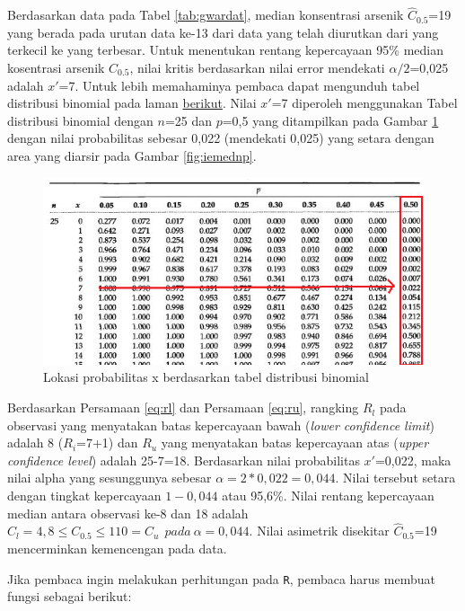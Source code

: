 \documentclass[]{book}
\begin{document}
Berdasarkan data pada Tabel \ref{tab:gwardat}, median konsentrasi
arsenik \(\hat{C}_{0.5}\)=19 yang berada pada urutan data ke-13 dari
data yang telah diurutkan dari yang terkecil ke yang terbesar. Untuk
menentukan rentang kepercayaan 95\% median kosentrasi arsenik
\(C_{0.5}\), nilai kritis berdasarkan nilai error mendekati
\(\alpha/2\)=0,025 adalah \(x'\)=7. Untuk lebih memahaminya pembaca
dapat mengunduh tabel distribusi binomial pada laman
\href{https://onlinepubs.trb.org/onlinepubs/nchrp/cd-22/manual/v2appendixc.pdf}{berikut}.
Nilai \(x'\)=7 diperoleh menggunakan Tabel distribusi binomial dengan
\(n\)=25 dan \(p\)=0,5 yang ditampilkan pada Gambar \ref{fig:tabbinom}
dengan nilai probabilitas sebesar 0,022 (mendekati 0,025) yang setara
dengan area yang diarsir pada Gambar \ref{fig:iemednp}.

\begin{figure}

{\centering \includegraphics[width=0.65\linewidth]{tabbinom} 

}

\caption{Lokasi probabilitas x berdasarkan tabel distribusi binomial}\label{fig:tabbinom}
\end{figure}

Berdasarkan Persamaan \eqref{eq:rl} dan Persamaan \eqref{eq:ru}, rangking
\(R_l\) pada observasi yang menyatakan batas kepercayaan bawah
(\emph{lower confidence limit}) adalah 8 (\(R_i\)=7+1) dan \(R_u\) yang
menyatakan batas kepercayaan atas (\emph{upper confidence level}) adalah
25-7=18. Berdasarkan nilai probabilitas \(x'\)=0,022, maka nilai alpha
yang sesunggunya sebesar \(\alpha=2*0,022=0,044\). Nilai tersebut setara
dengan tingkat kepercayaan \(1-0,044\) atau 95,6\%. Nilai rentang
kepercayaan median antara observasi ke-8 dan 18 adalah
\(C_l=4,8\le C_{0.5}\le110=C_u\ \ pada\ \alpha=0,044\). Nilai asimetrik
disekitar \(\hat{C}_{0.5}\)=19 mencerminkan kemencengan pada data.

Jika pembaca ingin melakukan perhitungan pada \texttt{R}, pembaca harus
membuat fungsi sebagai berikut:
\end{document}
